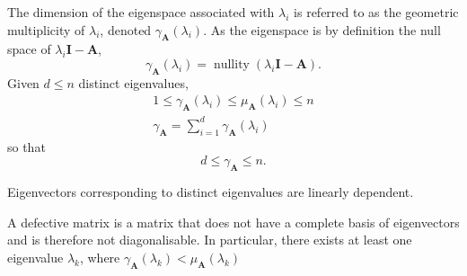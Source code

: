 \documentclass{article}
\DeclareMathOperator*{\nullity}{nullity}
\begin{document}
\begin{definition}
    The dimension of the eigenspace associated with \(\lambda_i\) is referred to as the
    geometric multiplicity of \(\lambda_i\), denoted \(\gamma_{\symbf{A}}\left( \lambda_i \right)\).
    As the eigenspace is by definition the null space of \(\lambda_i
    \symbf{I} - \symbf{A}\),
    \begin{equation*}
        \gamma_{\symbf{A}} \left( \lambda_i \right) = \nullity{\left( \lambda_i \symbf{I} - \symbf{A} \right)}.
    \end{equation*}
    Given \(d \leq n\) distinct eigenvalues,
    \begin{gather*}
        1 \leq \gamma_{\symbf{A}}\left( \lambda_i \right) \leq \mu_{\symbf{A}}\left( \lambda_i \right) \leq n \\
        \gamma_{\symbf{A}} = \sum_{i = 1}^d \gamma_{\symbf{A}} \left( \lambda_i \right)
    \end{gather*}
    so that
    \begin{equation*}
        d \leq \gamma_{\symbf{A}} \leq n.
    \end{equation*}
\end{definition}
\begin{theorem}
    Eigenvectors corresponding to distinct eigenvalues are linearly dependent.
\end{theorem}
\begin{definition}
    A defective matrix is a matrix that does not have a complete basis of eigenvectors and is therefore not diagonalisable.
    In particular, there exists at least one eigenvalue \(\lambda_k\),
    where \(\gamma_{\symbf{A}}\left( \lambda_k \right) < \mu_{\symbf{A}}\left( \lambda_k \right)\)
\end{definition}
\end{document}
